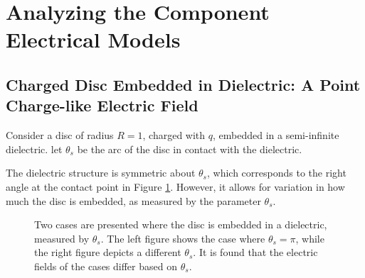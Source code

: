 \section{Analyzing the Component Electrical Models}
\subsection{Charged Disc Embedded in Dielectric: A Point Charge-like Electric Field}\label{cpt:charged disc}
\hspace{0em}\indent Consider a disc of radius $R=1$, charged with $q$, embedded in a semi-infinite dielectric. let $\theta_s$ be the arc of the disc in contact with the dielectric.

The dielectric structure is symmetric about $\theta_s$, which corresponds to the right angle at the contact point in Figure \ref{fig:disk in D}. However, it allows for variation in how much the disc is embedded, as measured by the parameter $\theta_s$.
\begin{figure}[H]
    \centering
    \hfill
    
    \caption{\small Two cases are presented where the disc is embedded in a dielectric, measured by $\theta_s$. The left figure shows the case where $\theta_s=\pi$, while the right figure depicts a different $\theta_s$. It is found that the electric fields of the cases differ based on $\theta_s$.}
    \label{fig:disk in D}
\end{figure}

